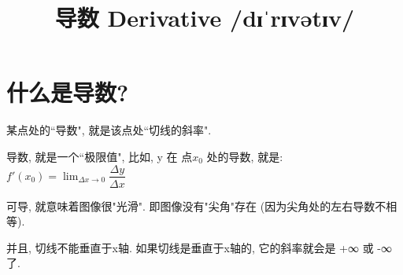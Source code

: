 \documentclass[UTF8]{ctexart}
\title{导数 Derivative /dɪˈrɪvətɪv/}
\begin{document}
	\tableofcontents %
	\maketitle  %




\part{什么是导数?}

某点处的``导数", 就是该点处``切线的斜率".

导数, 就是一个``极限值", 比如, y 在 点$x_0$ 处的导数, 就是:  $f'(x_0) = \lim_{\Delta x \to 0} \dfrac{\Delta y} {\Delta x} $




可导, 就意味着图像很"光滑". 即图像没有"尖角"存在 (因为尖角处的左右导数不相等).

并且, 切线不能垂直于x轴. 如果切线是垂直于x轴的, 它的斜率就会是 +∞ 或 -∞了.
\end{document}
